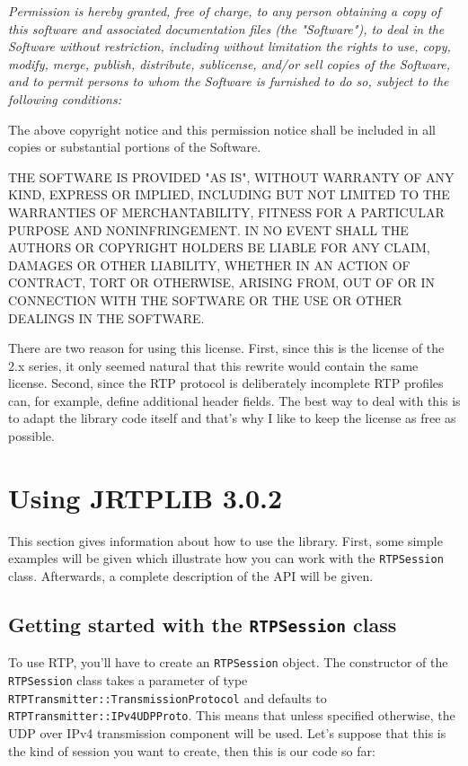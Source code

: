 \documentclass[12pt,a4paper]{article}
\newcommand{\jversion}{3.0.2}
\begin{document}
			{\em Permission is hereby granted, free of charge, to any person
			obtaining a copy of this software and associated documentation files
			(the "Software"), to deal in the Software without restriction,
			including without limitation the rights to use, copy, modify, merge,
			publish, distribute, sublicense, and/or sell copies of the Software,
			and to permit persons to whom the Software is furnished to do so,
			subject to the following conditions:

			The above copyright notice and this permission notice shall be
			included in all copies or substantial portions of the Software.

			THE SOFTWARE IS PROVIDED "AS IS", WITHOUT WARRANTY OF ANY
			KIND, EXPRESS OR IMPLIED, INCLUDING BUT NOT LIMITED TO THE
			WARRANTIES OF MERCHANTABILITY, FITNESS FOR A PARTICULAR PURPOSE AND
			NONINFRINGEMENT. IN NO EVENT SHALL THE AUTHORS OR COPYRIGHT HOLDERS
			BE LIABLE FOR ANY CLAIM, DAMAGES OR OTHER LIABILITY, WHETHER IN AN
			ACTION OF CONTRACT, TORT OR OTHERWISE, ARISING FROM, OUT OF OR IN
			CONNECTION WITH THE SOFTWARE OR THE USE OR OTHER DEALINGS IN THE
			SOFTWARE.}

		There are two reason for using this license. First, since this is the
		license of the 2.x series, it only seemed natural that this rewrite
		would contain the same license. Second, since the RTP protocol is
		deliberately incomplete RTP profiles can, for example, define additional
		header fields. The best way to deal with this is to adapt the library
		code itself and that's why I like to keep the license as free as
		possible.

	\section{Using JRTPLIB \jversion}
		
		This section gives information about how to use the library. First, some
		simple examples will be given which illustrate how you can work with the
		{\tt RTPSession} class. Afterwards, a complete description of the API
		will be given.

		\subsection{Getting started with the {\tt RTPSession} class}

			To use RTP, you'll have to create an {\tt RTPSession} object. The
			constructor of the {\tt RTPSession} class takes a parameter of
			type {\tt RTPTrans\-mitter::Trans\-mission\-Protocol} and defaults
			to {\tt RTPTrans\-mitter::IPv4UDPProto}. This means that unless
			specified otherwise, the UDP over IPv4 transmission component will
			be used. Let's suppose that this is the kind of session you want to
			create, then this is our code so far:
\end{document}
